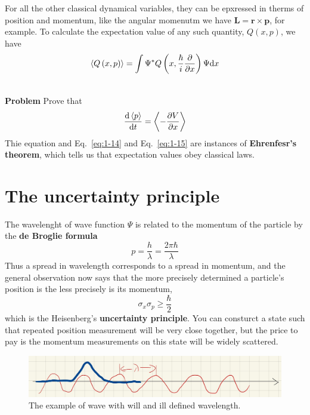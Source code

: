 For all the other classical dynamical variables, they can be epxressed in therms of position and momentum, like the angular momenutm we have $\mathbf{L}= \mathbf{r} \times \mathbf{p}$, for example.
To calculate the expectation value of any such quantity, $Q(x,p)$, we have
\begin{equation}
  \label{eq:1-18}
 \expval{Q \left( x,p \right)} = \int \Psi^{*} Q \left( x, \frac{\hbar}{i} \frac{\partial}{\partial x} \right) \Psi \dd x
\end{equation}

\begin{fullwidth}
  \hrulefill\\
  \textbf{Problem} Prove that
  \begin{equation}
    \frac{\dd \expval{p}}{\dd t} = \expval{- \frac{\partial V}{\partial x}} \nonumber
  \end{equation}
  Thie equation and Eq.~\eqref{eq:1-14} and Eq.~\eqref{eq:1-15} are instances of \textbf{Ehrenfesr's theorem}, which tells us that expectation values obey classical laws.
  \\ \hrulefill
\end{fullwidth}

\section{The uncertainty principle}
The wavelenght of wave function $\Psi$ is related to the momentum of the particle by the \textbf{de Broglie formula}
\begin{equation}
  \label{eq:1-19}
  p = \frac{h}{\lambda} = \frac{2\pi \hbar}{\lambda}
\end{equation}
Thus a spread in wavelength corresponds to a spread in momentum, and the general observation now says that the more precisely determined a particle's position is the less precisely is its momentum,
\begin{equation}
  \label{eq:1-20}
  \sigma_{x}\sigma_{p} \geq \frac{\hbar}{2}
\end{equation}
which is the Heisenberg's \textbf{uncertainty principle}.
You can consturct a state such that repeated position measurement will be very close together, but the price to pay is the momentum measurements on this state will be widely scattered.
\begin{figure}
  \centering
  \includegraphics[width=1.0\textwidth]{fig/fig1-1.png}
  \caption{The example of wave with will and ill defined wavelength.}
  \label{fig:1-1}
\end{figure}

